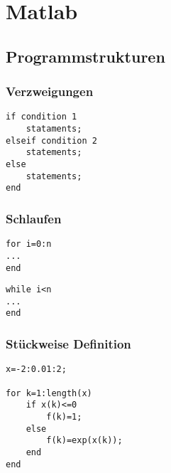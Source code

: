
\section{Matlab}

\subsection{Programmstrukturen}

\subsubsection{Verzweigungen}
\begin{lstlisting}[caption=if-Verzweigung, label=if]
if condition 1
    stataments;
elseif condition 2
    statements;
else
    statements;
end
\end{lstlisting}

\subsubsection{Schlaufen}
\begin{lstlisting}[caption=for-Schlaufe, label=for-loop]
for i=0:n
...
end
\end{lstlisting}

\begin{lstlisting}[caption=while-Schlaufe, label=while-loop]
while i<n
...
end
\end{lstlisting}

\subsubsection{Stückweise Definition}
\begin{lstlisting}[caption=Stückweise Definition, label=piecewise]
x=-2:0.01:2;

for k=1:length(x)
    if x(k)<=0
        f(k)=1;
    else
        f(k)=exp(x(k));
    end
end
\end{lstlisting}
